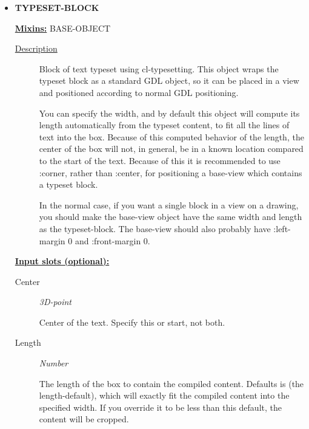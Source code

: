 \documentclass [11pt]{book}
\begin{document}
\begin{itemize}
\item {}
\textbf{TYPESET-BLOCK}


\textbf{
\underline{Mixins:}} BASE-OBJECT





\begin{description}

\item [
\underline{Description}]


Block of text typeset using cl-typesetting. This object
wraps the typeset block as a standard GDL object, so it can be placed in a view and 
positioned according to normal GDL positioning.

You can specify the width, and by default this object will compute its length automatically 
from the typeset content, to fit all the lines of text into the box. Because of this 
computed behavior of the length, the center of the box will not, in general, be in a 
known location compared to the start of the text. Because of this it is recommended
to use :corner, rather than :center, for positioning a base-view which contains
a typeset block. 

In the normal case, if you want a single block in a view on a drawing, you should
make the base-view object have the same width and length as the typeset-block. The
base-view should also probably have :left-margin 0 and :front-margin 0.



\end{description}








\textbf{
\underline{Input slots (optional):}}

\begin{description}

\item [Center]
\emph{3D-point}

 Center of the text. Specify this or start, not both.




\item [Length]
\emph{Number}

 The length of the box to contain the compiled content. Defaults is (the length-default),
which will exactly fit the compiled content into the specified width. If you override it to be less
than this default, the content will be cropped.





\end{description}
\end{itemize}
\end{document}
